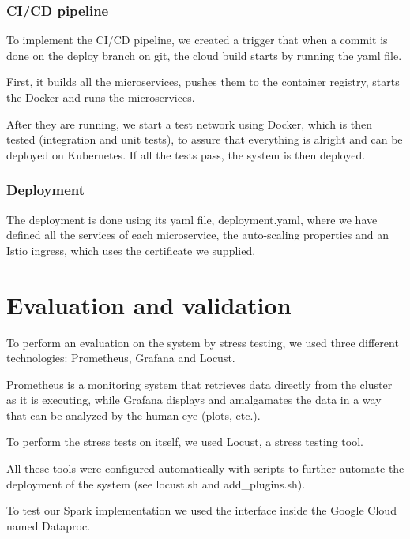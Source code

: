 \documentclass[oneside]{article}
\newcommand*\fpar{\hspace{1ex}}
\begin{document}
    \subsubsection{CI/CD pipeline}
    \fpar To implement the CI/CD pipeline, we created a trigger that when a commit is done on the deploy branch on git, the cloud build starts by running the yaml file. 
    \par First, it builds all the microservices, pushes them to the container registry, starts the Docker and runs the microservices. 
    \par After they are running, we start a test network using Docker, which is then tested (integration and unit tests), to assure that everything is alright and can be deployed on Kubernetes. If all the tests pass, the system is then deployed.

    \subsubsection{Deployment}
    \fpar The deployment is done using its yaml file, deployment.yaml, where we have defined all the services of each microservice, the auto-scaling properties and an Istio ingress, which uses the certificate we supplied.

\section{Evaluation and validation}
\label{sec:evaluation_and_validation}
\fpar To perform an evaluation on the system by stress testing, we used three different technologies: Prometheus, Grafana and Locust. 
\par Prometheus is a monitoring system that retrieves data directly from the cluster as it is executing, while Grafana displays and amalgamates the data in a way that can be analyzed by the human eye (plots, etc.). 
\par To perform the stress tests on itself, we used Locust, a stress testing tool. 
\par All these tools were configured automatically with scripts to further automate the deployment of the system (see locust.sh and add\_plugins.sh).
\par To test our Spark implementation we used the interface inside the Google Cloud named Dataproc.
\end{document}
